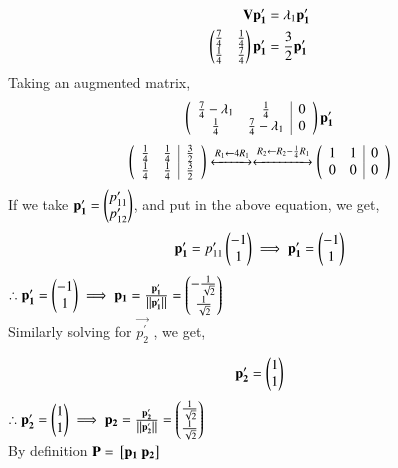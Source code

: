 \documentclass[journal]{IEEEtran}
\begin{document}
\begin{align}
	\mathbf{V}\mathbf{p_1^\prime} &= \lambda_1 \mathbf{p_1^\prime} \\
	\begin{pmatrix}\frac{7}{4} & \frac{1}{4} \\ \frac{1}{4} & \frac{7}{4}\end{pmatrix} \mathbf{p_1^\prime}  &= \frac{3}{2}\mathbf{p_1^\prime} \\
\end{align}
Taking an augmented matrix,
\begin{align}
	\left(
	\begin{array}{cc|c}
		\frac{7}{4} - \lambda_1 & \frac{1}{4} & 0\\ 
		\frac{1}{4} & \frac{7}{4} - \lambda_1& 0
	\end{array}\right)\mathbf{p_1^\prime} 
\end{align}
\begin{align}
	\left(
	\begin{array}{cc|c}
		\frac{1}{4} & \frac{1}{4} & \frac{3}{2}\\ 
		\frac{1}{4} & \frac{1}{4} & \frac{3}{2}
	\end{array}\right)
	\xleftrightarrow[]{R_1 \leftarrow {4 R_1}}
	\xleftrightarrow[]{R_2 \leftarrow {R_2-\frac{1}{4}R_1}}
	\left(
	\begin{array}{cc|c}
		1 & 1 & 0\\ 
		0 & 0 & 0
		\end{array}\right)
\end{align}
If we take $\mathbf{p_1^\prime}  = \begin{pmatrix}p_{11}^\prime \\ p_{12}^\prime\end{pmatrix}$, and put in the above equation, we get,
\begin{align}
	\mathbf{p_1^\prime} = p_{11}^\prime \begin{pmatrix}-1 \\ 1\end{pmatrix} \implies \mathbf{p_1^\prime} =  \begin{pmatrix}-1 \\ 1\end{pmatrix}
\end{align}
$\therefore \mathbf{p_1^\prime}  = \begin{pmatrix}-1 \\ 1\end{pmatrix} \implies \mathbf{p_1} = \frac{\mathbf{p_1^\prime} }{\left\lVert\mathbf{p_1^\prime}\right\rVert}  = \begin{pmatrix} -\frac{1}{\sqrt{2}} \\ \frac{1}{\sqrt{2}}\end{pmatrix}$ \\
Similarly solving for $\vec{p_2^\prime}$ , we get,

\begin{align}
	\mathbf{p_2^\prime} &=  \begin{pmatrix}1 \\ 1\end{pmatrix} \\
\end{align} 
$\therefore \mathbf{p_2^\prime}  = \begin{pmatrix}1 \\ 1\end{pmatrix} \implies \mathbf{p_2} = \frac{\mathbf{p_2^\prime} }{\left\lVert\mathbf{p_2^\prime}\right\rVert}  = \begin{pmatrix} \frac{1}{\sqrt{2}} \\ \frac{1}{\sqrt{2}}\end{pmatrix}$ \\
By definition $\mathbf{P} = {}\left[\mathbf{p_1} ~ \mathbf{p_2}\right]$ \\ 
\end{document}
